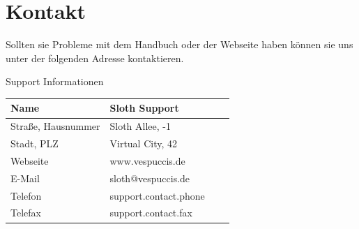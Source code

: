 \documentclass[a4paper,11pt]{scrartcl}
\begin{document}
\section{Kontakt}
Sollten sie Probleme mit dem Handbuch oder der Webseite haben können sie uns unter der folgenden Adresse kontaktieren.
\\[1em]
\begin{center}
Support Informationen
\end{center}
\begin{table}[h]
\begin{center}
{\footnotesize
\begin{tabular}{|p{}|p{}|p{}|p{}|}

\hline
									
						Name & Sloth Support  									\\\hline
						Straße, Hausnummer  & Sloth Allee, -1    \\\hline
						Stadt, PLZ &  Virtual City, 42   					\\\hline
						Webseite  & www.vespuccis.de   						 \\\hline
						E-Mail  & sloth@vespuccis.de   							\\\hline
						Telefon   & support.contact.phone     			 \\\hline
						Telefax &  	 support.contact.fax 						  \\\hline
					

\end{tabular}
}

\end{center}
\end{table}
\end{document}
